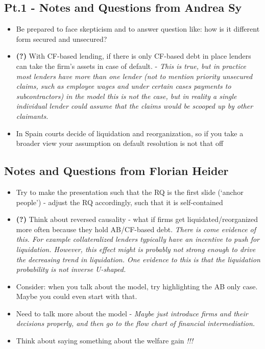 \documentclass[12pt]{article}
\begin{document}
\subsection*{Pt.1 - Notes and Questions from Andrea Sy \checkmark} 
\begin{itemize} \setlength\itemsep{0em}  \small
    \item Be prepared to face skepticism and to answer question like: how is it different form secured and unsecured? 
    \item \textbf{(?)}  With CF-based lending, if there is only CF-based debt in place lenders can take the firm's assets in case of default. - \textit{This is true, but in practice most lenders have more than one lender (not to mention priority unsecured claims, such as employee wages and under certain cases payments to subcontractors) in the model this is not the case, but in reality a single individual lender could assume that the claims would be scooped up by other claimants.}
    \item In Spain courts decide of liquidation and reorganization, so if you take a broader view your assumption on default resolution is not that off
\end{itemize} \normalsize

\subsection*{Notes and Questions from Florian Heider \checkmark}
\begin{itemize} \setlength\itemsep{0em}  \small
    \item Try to make the presentation such that the RQ is the first slide (`anchor people') - adjust the RQ accordingly, such that it is self-contained
    \item \textbf{(?)}  Think about reversed causality - what if firms get liquidated/reorganized more often because they hold AB/CF-based debt. \textit{There is come evidence of this. For example collateralized lenders typically have an incentive to push for liquidation. However, this effect might is probably not strong enough to drive the decreasing trend in liquidation. One evidence to this is that the liquidation probability is not inverse U-shaped.} 
    \item Consider: when you talk about the model, try highlighting the AB only case. Maybe you could even start with that. 
    \item Need to talk more about the model - \textit{Maybe just introduce firms and their decisions properly, and then go to the flow chart of financial intermediation.}
    \item Think about saying something about the welfare gain \textit{!!!}
\end{itemize} \normalsize
\end{document}

